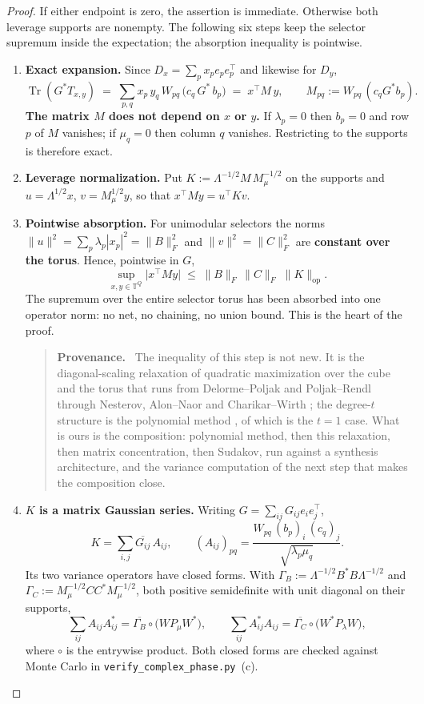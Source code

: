 \documentclass[11pt,a4paper]{article}
\theoremstyle{plain}
\theoremstyle{definition}
\theoremstyle{remark}
\DeclareMathOperator{\Tr}{Tr}
\DeclareMathOperator{\op}{op}
\newcommand{\T}{\mathbb T}
\newcommand{\Fro}[1]{\|#1\|_F}
\newenvironment{callout}[1]{\par\medskip\noindent\begin{quote}\small\textbf{#1}\ }{\end{quote}\medskip}
\begin{document}
\begin{proof}
If either endpoint is zero, the assertion is immediate. Otherwise both leverage
supports are nonempty. The following six steps keep the selector supremum inside
the expectation; the absorption inequality is pointwise.
\begin{enumerate}[leftmargin=*]
\item \textbf{Exact expansion.} Since $D_x=\sum_px_pe_pe_p^{\top}$ and likewise for $D_y$,
\[
\Tr(G^{*}T_{x,y})\;=\;\sum_{p,q}x_p\,y_q\,W_{pq}\,\bigl(c_q\,G^{*}\,b_p\bigr)\;=\;x^{\top}M\,y,
\qquad M_{pq}:=W_{pq}\,(c_qG^{*}b_p).
\]
\textbf{The matrix $M$ does not depend on $x$ or $y$.} If $\lambda_p=0$ then $b_p=0$ and row
$p$ of $M$ vanishes; if $\mu_q=0$ then column $q$ vanishes. Restricting to the supports is
therefore exact.

\item \textbf{Leverage normalization.} Put $K:=\Lambda^{-1/2}M\,M_\mu^{-1/2}$ on the supports
and $u=\Lambda^{1/2}x$, $v=M_\mu^{1/2}y$, so that $x^{\top}My=u^{\top}Kv$.

\item \textbf{Pointwise absorption.} For unimodular selectors the norms
$\|u\|^2=\sum_p\lambda_p|x_p|^2=\Fro{B}^2$ and $\|v\|^2=\Fro{C}^2$ are \textbf{constant over
the torus}. Hence, pointwise in $G$,
\[
\sup_{x,y\in\T^Q}\bigl|x^{\top}My\bigr|\;\le\;\Fro{B}\,\Fro{C}\;\|K\|_{\op}.
\]
The supremum over the entire selector torus has been absorbed into one operator norm: no
net, no chaining, no union bound. This is the heart of the proof.

\begin{callout}{Provenance.}
The inequality of this step is not new. It is the diagonal-scaling relaxation of quadratic
maximization over the cube and the torus that runs from Delorme--Poljak and Poljak--Rendl
through Nesterov, Alon--Naor and Charikar--Wirth \cite{DP93,PR95,Nes98,AN06,CW04}; the
degree-$t$ structure is the polynomial method \cite{BBCMW98}, of which \cite[Thm~6.7]{AK07}
is the $t=1$ case. What is ours is the composition: polynomial method, then this relaxation,
then matrix concentration, then Sudakov, run against a synthesis architecture, and the
variance computation of the next step that makes the composition close.
\end{callout}

\item \textbf{$K$ is a matrix Gaussian series.} Writing $G=\sum_{ij}G_{ij}e_ie_j^{\top}$,
\[
K=\sum_{i,j}\overline{G_{ij}}\,A_{ij},\qquad
(A_{ij})_{pq}=\frac{W_{pq}\,(b_p)_i\,(c_q)_j}{\sqrt{\lambda_p\mu_q}}.
\]
Its two variance operators have closed forms. With $\Gamma_B:=\Lambda^{-1/2}B^{*}B\Lambda^{-1/2}$
and $\Gamma_C:=M_\mu^{-1/2}CC^{*}M_\mu^{-1/2}$, both positive semidefinite with unit diagonal on
their supports,
\[
\sum_{ij}A_{ij}A_{ij}^{*}=\overline{\Gamma_B}\circ\bigl(WP_\mu W^{*}\bigr),\qquad
\sum_{ij}A_{ij}^{*}A_{ij}=\overline{\Gamma_C}\circ\bigl(W^{*}P_\lambda W\bigr),
\]
where $\circ$ is the entrywise product. Both closed forms are checked against Monte Carlo in
\texttt{verify\_complex\_phase.py}~(c).


\end{enumerate}
\end{proof}
\end{document}
